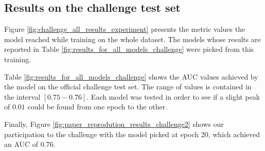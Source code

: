 \subsection{Results on the challenge test set}
\setlength{\marginparwidth}{1.5cm}\leavevmode {}Figure \ref{fig:challenge_all_results_experiment} presents the metric values the model reached while training on the whole dataset. The models whose results are reported in Table \ref{fig:results_for_all_models_challenge} were picked from this training.

\noindent Table \ref{fig:results_for_all_models_challenge} shows the AUC values achieved by the model on the official challenge test set. The range of values is contained in the interval $[0.75-0.76]$. Each model was tested in order to see if a slight peak of $0.01$ could be found from one epoch to the other.

\noindent Finally, Figure \ref{fig:paper_reprodution_results_challenge2} shows our participation to the challenge with the model picked at epoch 20, which achieved an AUC of $0.76$.

\newpage

